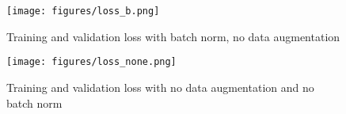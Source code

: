 \documentclass{article}
\begin{document}
\begin{figure}[h]
    \centering
    \texttt{[image: figures/loss\_b.png]}
    \caption{Training and validation loss with batch norm, no data augmentation}
    \label{fig:loss}
  \end{figure}

\begin{figure}[h]
    \centering
    \texttt{[image: figures/loss\_none.png]}
    \caption{Training and validation loss with no data augmentation and no batch norm}
    \label{fig:loss}
  \end{figure}
\end{document}
